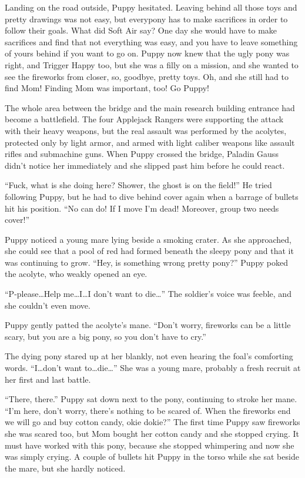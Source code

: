 Landing on the road outside, Puppy hesitated. Leaving behind all those toys and pretty drawings was not easy, but everypony has to make sacrifices in order to follow their goals. What did Soft Air say? One day she would have to make sacrifices and find that not everything was easy, and you have to leave something of yours behind if you want to go on. Puppy now knew that the ugly pony was right, and Trigger Happy too, but she was a filly on a mission, and she wanted to see the fireworks from closer, so, goodbye, pretty toys. Oh, and she still had to find Mom! Finding Mom was important, too! Go Puppy!



\horizonline


The whole area between the bridge and the main research building entrance had become a battlefield. The four Applejack Rangers were supporting the attack with their heavy weapons, but the real assault was performed by the acolytes, protected only by light armor, and armed with light caliber weapons like assault rifles and submachine guns. When Puppy crossed the bridge, Paladin Gauss didn't notice her immediately and she slipped past him before he could react.

``Fuck, what is she doing here? Shower, the ghost is on the field!'' He tried following Puppy, but he had to dive behind cover again when a barrage of bullets hit his position. ``No can do! If I move I'm dead! Moreover, group two needs cover!''

Puppy noticed a young mare lying beside a smoking crater. As she approached, she could see that a pool of red had formed beneath the sleepy pony and that it was continuing to grow. ``Hey, is something wrong pretty pony?'' Puppy poked the acolyte, who weakly opened an eye.

``P-please\dots Help me\dots I\dots I don't want to die\dots'' The soldier's voice was feeble, and she couldn't even move.

Puppy gently patted the acolyte's mane. ``Don't worry, fireworks can be a little scary, but you are a big pony, so you don't have to cry.''

The dying pony stared up at her blankly, not even hearing the foal's comforting words. ``I\dots don't want to\dots die\dots'' She was a young mare, probably a fresh recruit at her first and last battle.

``There, there.'' Puppy sat down next to the pony, continuing to stroke her mane. ``I'm here, don't worry, there's nothing to be scared of. When the fireworks end we will go and buy cotton candy, okie dokie?'' The first time Puppy saw fireworks she was scared too, but Mom bought her cotton candy and she stopped crying. It must have worked with this pony, because she stopped whimpering and now she was simply crying. A couple of bullets hit Puppy in the torso while she sat beside the mare, but she hardly noticed.

